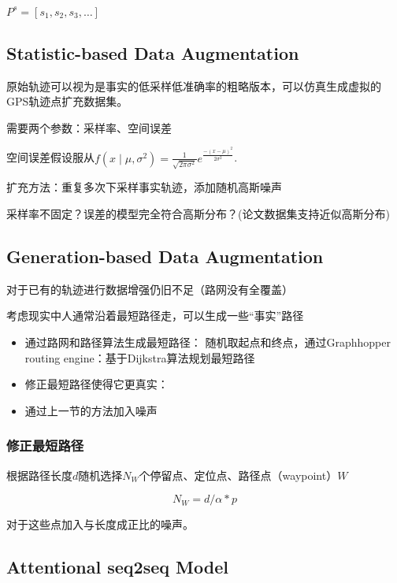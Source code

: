 \begin{definition}[基于路段的轨迹]
    $ P^{s}=\left[s_{1}, s_{2}, s_{3}, \ldots\right] $
\end{definition}

\subsection{Statistic-based Data Augmentation}

原始轨迹可以视为是事实的低采样低准确率的粗略版本，可以仿真生成虚拟的GPS轨迹点扩充数据集。

需要两个参数：采样率、空间误差

空间误差假设服从$ f\left(x \mid \mu, \sigma^{2}\right)=\frac{1}{\sqrt{2 \pi \sigma^{2}}} e^{\frac{-(x-\mu)^{2}}{2 \sigma^{2}}} $.

扩充方法：重复多次下采样事实轨迹，添加随机高斯噪声

\begin{remark}
    采样率不固定？误差的模型完全符合高斯分布？(论文数据集支持近似高斯分布)
\end{remark}

\subsection{Generation-based Data Augmentation}

对于已有的轨迹进行数据增强仍旧不足（路网没有全覆盖）

考虑现实中人通常沿着最短路径走，可以生成一些“事实”路径

\begin{itemize}
    \item 通过路网和路径算法生成最短路径： 随机取起点和终点，通过Graphhopper routing engine：基于Dijkstra算法规划最短路径
    \item 修正最短路径使得它更真实：
    \item 通过上一节的方法加入噪声
\end{itemize}

\subsubsection{修正最短路径}

根据路径长度$d$随机选择$N_W$个停留点、定位点、路径点（waypoint）$W$

$$ N_{W}=d / \alpha * p $$

对于这些点加入与长度成正比的噪声。

\subsection{Attentional seq2seq Model}

